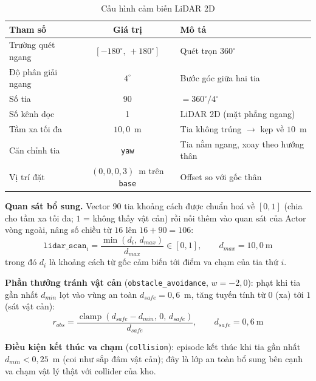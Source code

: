 \begin{table}[H]
    \centering
    \caption{Cấu hình cảm biến LiDAR 2D}
    \label{tab:lidar_cfg}
    \renewcommand{\arraystretch}{1.3}
    \begin{tabular}{|l|c|l|}
    \hline
    \textbf{Tham số} & \textbf{Giá trị} & \textbf{Mô tả} \\
    \hline
    Trường quét ngang & $[-180^\circ,\,+180^\circ]$ & Quét trọn $360^\circ$ \\
    Độ phân giải ngang & $4^\circ$ & Bước góc giữa hai tia \\
    Số tia & 90 & $= 360^\circ / 4^\circ$ \\
    Số kênh dọc & 1 & LiDAR 2D (mặt phẳng ngang) \\
    Tầm xa tối đa & $10{,}0$~m & Tia không trúng $\to$ kẹp về $10$~m \\
    Căn chỉnh tia & \texttt{yaw} & Tia nằm ngang, xoay theo hướng thân \\
    Vị trí đặt & $(0,0,0{,}3)$~m trên \texttt{base} & Offset so với gốc thân \\
    \hline
    \end{tabular}
\end{table}

\textbf{Quan sát bổ sung.} Vector $90$ tia khoảng cách được chuẩn hoá về
$[0,1]$ (chia cho tầm xa tối đa; $1$ = không thấy vật cản) rồi nối thêm vào
quan sát của Actor vòng ngoài, nâng số chiều từ $16$ lên $16+90 = 106$:
\begin{equation}
    \texttt{lidar\_scan}_i = \frac{\min(d_i,\,d_{max})}{d_{max}}\in[0,1],
    \qquad d_{max}=10{,}0~\text{m}
    \label{eq:lidar_scan}
\end{equation}
trong đó $d_i$ là khoảng cách từ gốc cảm biến tới điểm va chạm của tia thứ $i$.

\textbf{Phần thưởng tránh vật cản} (\texttt{obstacle\_avoidance}, $w=-2{,}0$):
phạt khi tia gần nhất $d_{min}$ lọt vào vùng an toàn $d_{safe}=0{,}6$~m, tăng
tuyến tính từ $0$ (xa) tới $1$ (sát vật cản):
\begin{equation}
    r_{obs} = \frac{\operatorname{clamp}(d_{safe}-d_{min},\,0,\,d_{safe})}{d_{safe}},
    \qquad d_{safe}=0{,}6~\text{m}
    \label{eq:rew_obstacle}
\end{equation}

\textbf{Điều kiện kết thúc va chạm} (\texttt{collision}): episode kết thúc khi
tia gần nhất $d_{min} < 0{,}25$~m (coi như sắp đâm vật cản); đây là lớp an toàn
bổ sung bên cạnh va chạm vật lý thật với collider của kho.

